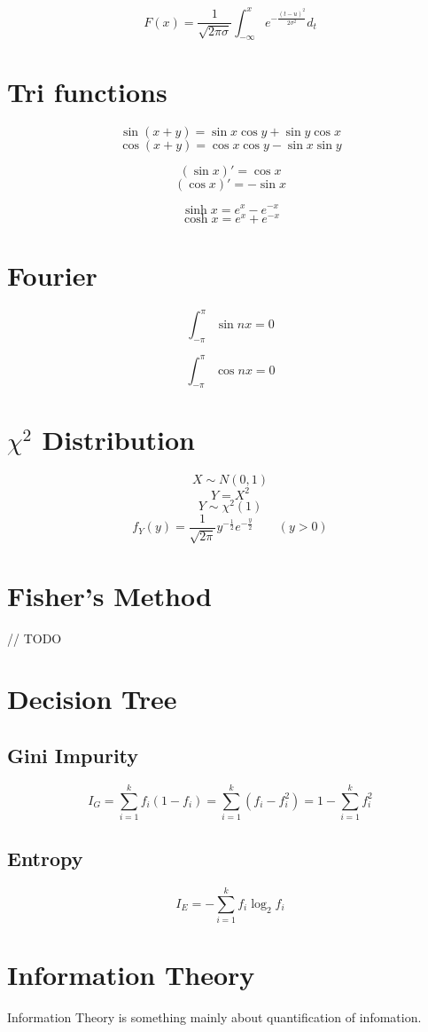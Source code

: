 \documentclass[twocolumn]{article}
\begin{document}
\[F(x) = \frac{1}{\sqrt{2\pi\sigma}}\int_{-\infty}^x e^{-\frac{(t-u)^2}{2\sigma^2}}d_t \]

\section{Tri functions}
\[\sin (x+y) = \sin x\cos y + \sin y\cos x\]
\[\cos (x+y) = \cos x\cos y - \sin x\sin y\]

\[(\sin x)' = \cos x\]
\[(\cos x)' = -\sin x\]

\[\sinh x = e^x - e^{-x}\]
\[\cosh x = e^x + e^{-x}\]

\section{Fourier}

\[\int_{-\pi}^{\pi} \sin nx = 0\]

\[\int_{-\pi}^{\pi} \cos nx = 0\]

\section{$\chi^2$ Distribution}
\[X \sim N(0,1)\]
\[Y = X^2\]
\[Y \sim \chi^2(1)\]
\[f_Y(y) = \frac{1}{\sqrt{2\pi}}y^{-\frac{1}{2}}e^{-\frac{y}{2}}\qquad (y>0)\]


\section{Fisher's Method}
// TODO

\section{Decision Tree}
\subsection{Gini Impurity}
\[I_G = \sum_{i=1}^k f_i(1-f_i) = \sum_{i=1}^k (f_i - f_i^2) = 1 - \sum_{i=1}^k f_i^2\]

\subsection{Entropy}
\[I_E = -\sum_{i=1}^k f_i\log_2{f_i}\]

\section{Information Theory}
Information Theory is something mainly about quantification of infomation.
\end{document}
